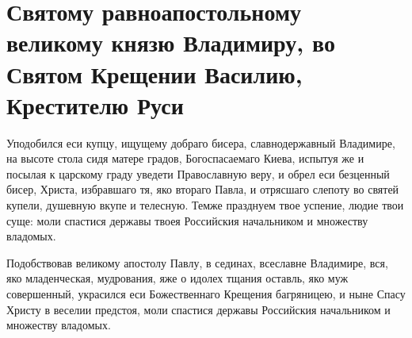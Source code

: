 \section{Святому равноапостольному великому князю Владимиру, во Святом Крещении Василию, Крестителю Руси}\begin{mymulticols}


Уподобился еси купцу, ищущему добраго бисера, славнодержавный Владимире, на высоте стола сидя матере градов, Богоспасаемаго Киева, испытуя же и посылая к царскому граду уведети Православную веру, и обрел еси безценный бисер, Христа, избравшаго тя, яко втораго Павла, и отрясшаго слепоту во святей купели, душевную вкупе и телесную. Темже празднуем твое успение, людие твои суще: моли спастися державы твоея Российския начальником и множеству владомых.


Подобствовав великому апостолу Павлу, в сединах, всеславне Владимире, вся, яко младенческая, мудрования, яже о идолех тщания оставль, яко муж совершенный, украсился еси Божественнаго Крещения багряницею, и ныне Спасу Христу в веселии предстоя, моли спастися державы Российския начальником и множеству владомых.



\end{mymulticols}
